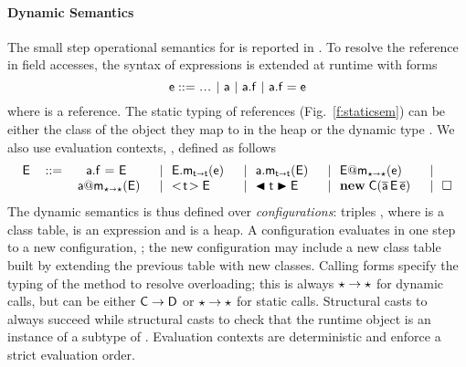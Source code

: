 \documentclass[acmlarge, anonymous, authordraft]{acmart}
\begin{document}
\paragraph{Dynamic Semantics}
The small step operational semantics for \kafka is reported in
.  To resolve the \this reference in field accesses,
the syntax of expressions is extended at runtime with forms
%
\[ \e  ::= \dots \B \a \B \FReadR\a\f \B \FWriteR\a\f\e \]
%
where \a is a reference.  The static typing of references
(Fig.~\ref{f:staticsem}) can be either the class of the object they map to
in the heap \s or the dynamic type \any.
We also use evaluation contexts, \EE, defined as follows
\[
\begin{tabular}{llllllllllllllllll}
\EE &::=& ~ \FWriteR\a\f\EE   &\B  
        \KCall\EE\m\e\t\t  &\B
        \KCall\a\m{\EE}\t\t &\B
        \DynCall\EE\m\e   &\B\\
&       & \DynCall\a\m\EE   &\B
       \SubCast\t\EE  &\B
      \BehCast\t\EE  &\B
       \New\C{\b \a\,\EE\,\b\e} &\B 
      \EM{\square}
\end{tabular}
\]
\noindent
The dynamic semantics is thus defined over \emph{configurations}: triples
\K\e\s, where \K is a class table, \e is an expression and \s is a heap.  A
configuration evaluates in one step to a new configuration, \Reduce
\K\e\s\Kp\ep\sp; the new configuration may include a new class table built
by extending the previous table with new classes.
Calling forms specify the typing of the method to resolve overloading; this
is always \(\star \to \star\) for dynamic calls, but can be either \({\sf{C}} \to
{\sf{D}}\) or \(\star \to \star\) for static calls.  Structural casts to \any always
succeed while structural casts to \C check that the runtime object is an
instance of a subtype of \C.  Evaluation contexts are deterministic and
enforce a strict evaluation order.
\end{document}
